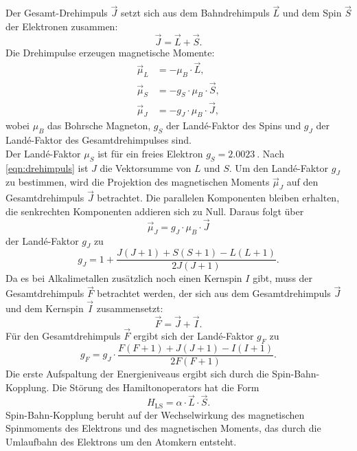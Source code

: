 Der Gesamt-Drehimpuls $\vec{J}$ setzt sich aus dem Bahndrehimpuls $\vec{L}$ und dem Spin $\vec{S}$ der Elektronen zusammen:
\begin{equation}\label{eqn:drehimpuls}
    \vec{J} = \vec{L} + \vec{S}.
\end{equation}
Die Drehimpulse erzeugen magnetische Momente:
\begin{align*}
    \vec{\mu}_L &= - \mu_B \cdot \vec{L}, \\
    \vec{\mu}_S &= - g_S \cdot \mu_B \cdot \vec{S}, \\
    \vec{\mu}_J &= - g_J \cdot \mu_B \cdot \vec{J},
\end{align*}
wobei $\mu_B$ das Bohrsche Magneton, $g_S$ der Landé-Faktor des Spins und $g_J$ der Landé-Faktor des Gesamtdrehimpulses sind.\\
Der Landé-Faktor $\mu_S$ ist für ein freies Elektron $g_S = \SI{2.0023}{}$. Nach \autoref{eqn:drehimpuls} ist $J$ die Vektorsumme von $L$ und $S$. Um den Landé-Faktor $g_J$ zu bestimmen, wird die Projektion
des magnetischen Moments $\vec{\mu}_J$ auf den Gesamtdrehimpuls $\vec{J}$ betrachtet. Die parallelen Komponenten bleiben erhalten, die senkrechten Komponenten addieren sich zu Null. Daraus folgt
über 
\begin{equation*}
    \vec{\mu}_J = g_J \cdot \mu_B \cdot \vec{J}
\end{equation*}
der Landé-Faktor $g_J$ zu 
\begin{equation}
    g_J = 1 + \frac{J(J+1) + S(S+1) - L(L+1)}{2J(J+1)}.
\end{equation}
Da es bei Alkalimetallen zusätzlich noch einen Kernspin $I$ gibt, muss der Gesamtdrehimpuls $\vec{F}$ betrachtet werden, der sich aus dem Gesamtdrehimpuls $\vec{J}$ und dem Kernspin $\vec{I}$ zusammensetzt:
\begin{equation*}
    \vec{F} = \vec{J} + \vec{I}.
\end{equation*}
Für den Gesamtdrehimpuls $\vec{F}$ ergibt sich der Landé-Faktor $g_F$ zu
\begin{equation}
    \label{eqn:t2}
    g_F = g_J \cdot \frac{F(F+1) + J(J+1) - I(I+1)}{2F(F+1)}.
\end{equation}
Die erste Aufspaltung der Energieniveaus ergibt sich durch die Spin-Bahn-Kopplung. Die Störung des Hamiltonoperators hat die Form
\begin{equation*}
    H_{\text{LS}} = \alpha \cdot \vec{L} \cdot \vec{S}.
\end{equation*}
Spin-Bahn-Kopplung beruht auf der Wechselwirkung des magnetischen Spinmoments des Elektrons und des magnetischen Moments, das durch die Umlaufbahn des Elektrons um den Atomkern entsteht.
